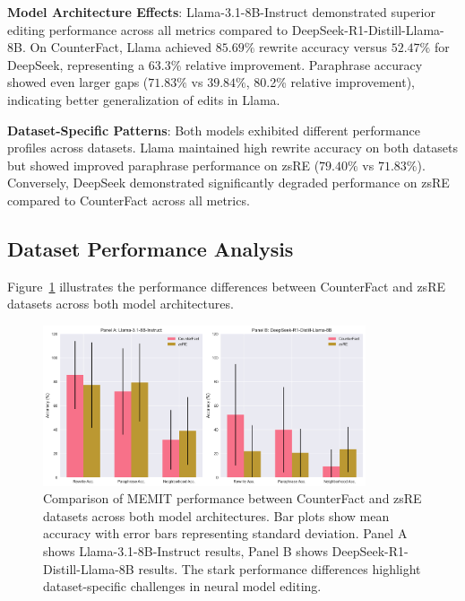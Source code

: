 \textbf{Model Architecture Effects}: Llama-3.1-8B-Instruct demonstrated superior editing performance across all metrics compared to DeepSeek-R1-Distill-Llama-8B. On CounterFact, Llama achieved $85.69\%$ rewrite accuracy versus $52.47\%$ for DeepSeek, representing a 63.3\% relative improvement. Paraphrase accuracy showed even larger gaps ($71.83\%$ vs $39.84\%$, 80.2\% relative improvement), indicating better generalization of edits in Llama.

\textbf{Dataset-Specific Patterns}: Both models exhibited different performance profiles across datasets. Llama maintained high rewrite accuracy on both datasets but showed improved paraphrase performance on zsRE ($79.40\%$ vs $71.83\%$). Conversely, DeepSeek demonstrated significantly degraded performance on zsRE compared to CounterFact across all metrics.

\subsection{Dataset Performance Analysis}
\label{subsec:dataset_performance}

Figure~\ref{fig:dataset_comparison} illustrates the performance differences between CounterFact and zsRE datasets across both model architectures.

\begin{figure}[H]
\centering
\includegraphics[width=0.85\textwidth]{figures/dataset_comparison.png}
\caption[Performance Comparison Between CounterFact and zsRE Datasets]{Comparison of MEMIT performance between CounterFact and zsRE datasets across both model architectures. Bar plots show mean accuracy with error bars representing standard deviation. Panel A shows Llama-3.1-8B-Instruct results, Panel B shows DeepSeek-R1-Distill-Llama-8B results. The stark performance differences highlight dataset-specific challenges in neural model editing.}
\label{fig:dataset_comparison}
\end{figure}

